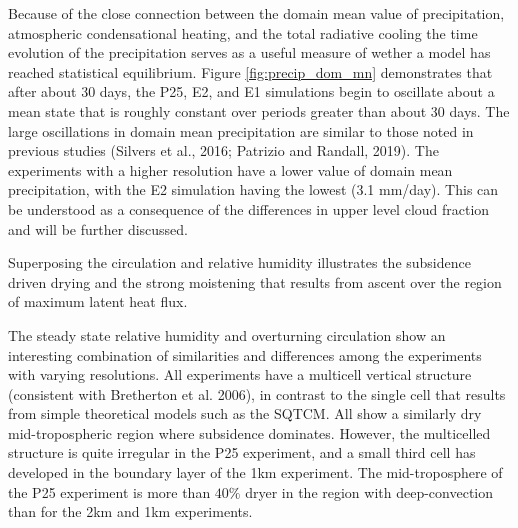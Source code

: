 \documentclass[11pt]{article}   	%
\begin{document}
Because of the close connection between the domain mean value of precipitation, atmospheric condensational heating, and 
the total radiative cooling the time evolution of the precipitation serves as a useful measure of wether a model has 
reached statistical equilibrium.  Figure \ref{fig:precip_dom_mn} demonstrates that after about 30 days, the P25, E2, and E1
simulations begin to oscillate about a mean state that is roughly constant over periods greater than about 30 days. 
The large oscillations in domain mean precipitation are similar to those noted in previous studies 
(Silvers et al., 2016; Patrizio and Randall, 2019).   The experiments with a higher resolution have a lower value of domain
mean precipitation, with the E2 simulation having the lowest (3.1 mm/day).  This can be understood as a consequence
of the differences in upper level cloud fraction and will be further discussed.   

Superposing the circulation and relative humidity illustrates the subsidence driven 
drying and the strong moistening that results from ascent over the region of maximum latent heat flux.  

The steady state relative humidity and overturning circulation show an interesting combination of similarities and differences
among the experiments with varying resolutions.  All experiments have a multicell vertical structure (consistent with 
Bretherton et al. 2006), in contrast to the single cell that results from simple theoretical models such as the SQTCM.   All 
show a similarly dry mid-tropospheric region where subsidence dominates.  However, the multicelled structure is quite irregular
in the P25 experiment, and a small third cell has developed in the boundary layer of the 1km experiment.  The mid-troposphere 
of the P25 experiment is more than $40\%$ dryer in the region with deep-convection than for the 2km and 1km experiments. 
\end{document}
